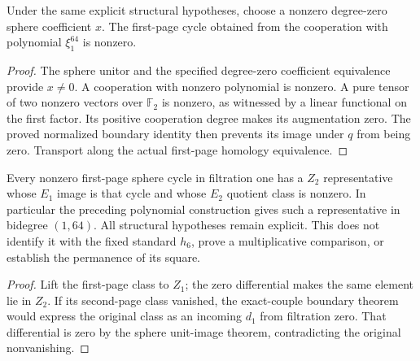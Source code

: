 \begin{proposition}
  \label{prop:h6-nonzero-first-cycle}
  \leanok
  Under the same explicit structural hypotheses, choose a nonzero
  degree-zero sphere coefficient $x$. The first-page cycle obtained from
  the cooperation with polynomial $\xi_1^{64}$ is nonzero.
\end{proposition}
\begin{proof}
  The sphere unitor and the specified degree-zero coefficient equivalence
  provide $x\ne0$. A cooperation with nonzero polynomial is nonzero.
  A pure tensor of two nonzero vectors over $\mathbb F_2$ is nonzero,
  as witnessed by a linear functional on the first factor. Its positive
  cooperation degree makes its augmentation zero. The proved normalized
  boundary identity then prevents its image under $q$ from being zero.
  Transport along the actual first-page homology equivalence.
  \leanok
\end{proof}

\begin{proposition}
  \label{prop:h6-nonzero-second-page}
  \leanok
  Every nonzero first-page sphere cycle in filtration one has a
  $Z_2$ representative whose $E_1$ image is that cycle and whose $E_2$
  quotient class is nonzero. In particular the preceding polynomial
  construction gives such a representative in bidegree $(1,64)$.
  All structural hypotheses remain explicit. This does not identify it
  with the fixed standard $h_6$, prove a multiplicative comparison, or
  establish the permanence of its square.
\end{proposition}
\begin{proof}
  Lift the first-page class to $Z_1$; the zero differential makes the
  same element lie in $Z_2$. If its second-page class vanished, the
  exact-couple boundary theorem would express the original class as an
  incoming $d_1$ from filtration zero. That differential is zero by the
  sphere unit-image theorem, contradicting the original nonvanishing.
  \leanok
\end{proof}

